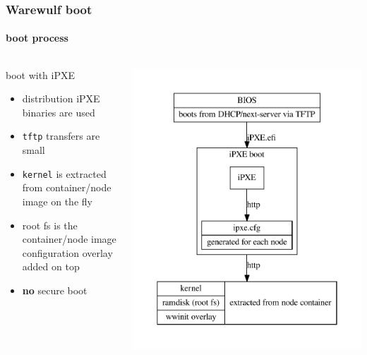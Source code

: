\documentclass[aspectratio=169]{beamer}
\begin{document}
\begin{frame}[fragile]
\frametitle{Warewulf boot}
\framesubtitle{boot process}
\begin{columns}
\begin{block}{boot with iPXE}
\begin{itemize}
  \item distribution iPXE binaries are used
  \item \texttt{tftp} transfers are small
  \item \texttt{kernel} is extracted from container/node image on the fly
  \item root fs is the container/node image\\
  configuration overlay added on top
  \item \textbf{no} secure boot
\end{itemize}
\end{block}
\includegraphics[width=.9\linewidth]{ipxe_boot}
\end{columns}
\end{frame}
\end{document}
